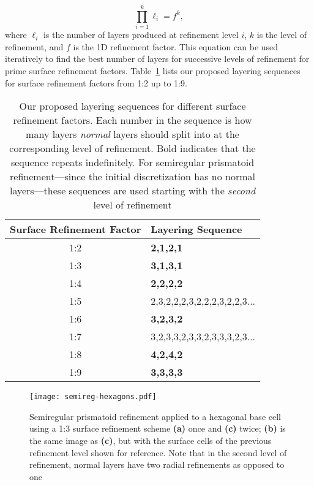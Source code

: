 \begin{equation*}
\prod_{i = 1}^{k} \ell_{i} = f^{k},
\end{equation*}
%
where $\ell_{i}$ is the number of layers produced at refinement level $i$, $k$ is the level of refinement, and $f$ is the 1D refinement factor.
This equation can be used iteratively to find the best number of layers for successive levels of refinement for prime surface refinement factors.
Table~\ref{tab:layers} lists our proposed layering sequences for surface refinement factors from 1:2 up to 1:9.


\begin{table}[h]
	\centering
	\begin{tabular}{@{}cl@{}}
		\toprule
		Surface Refinement Factor & Layering Sequence       \\ \midrule
		1:2                  & \textbf{2,1,2,1}             \\ 
		1:3                  & \textbf{3,1,3,1}             \\ 
		1:4                  & \textbf{2,2,2,2}             \\ 
		1:5                  & 2,3,2,2,2,3,2,2,2,3,2,2,3... \\ 
		1:6                  & \textbf{3,2,3,2}             \\ 
		1:7                  & 3,2,3,3,2,3,3,2,3,3,3,2,3... \\ 
		1:8                  & \textbf{4,2,4,2}             \\
		1:9                  & \textbf{3,3,3,3}             \\ \bottomrule
	\end{tabular}
	\caption{Our proposed layering sequences for different surface refinement factors.
		Each number in the sequence is how many layers \textit{normal} layers should split into at the corresponding level of refinement.
		Bold indicates that the sequence repeats indefinitely.
		For semiregular prismatoid refinement---since the initial discretization has no normal layers---these sequences are used starting with the \textit{second} level of refinement}
	\label{tab:layers}
\end{table}


\begin{figure}[h]
	\centering
	\texttt{[image: semireg-hexagons.pdf]}
	\caption{Semiregular prismatoid refinement applied to a hexagonal base cell using a 1:3 surface refinement scheme \textbf{(a)} once and \textbf{(c)} twice; \textbf{(b)} is the same image as \textbf{(c)}, but with the surface cells of the previous refinement level shown for reference.
		Note that in the second level of refinement, normal layers have two radial refinements as opposed to one}
	\label{fig:hexagons}
\end{figure}


